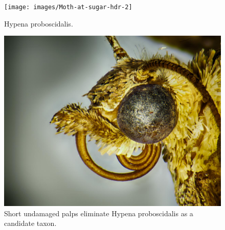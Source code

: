 \documentclass[]{article}
\begin{document}
\begin{figure}
	\centering
	\texttt{[image: images/Moth-at-sugar-hdr-2]}
	\caption{Hypena proboscidalis.}
	\label{fig:moth-at-sugar-hdr-2}
\end{figure}

\begin{figure}
	\centering
	\includegraphics[width=0.5\linewidth]{images/20201112-1}
	\caption{Short undamaged palps eliminate Hypena proboscidalis as a candidate taxon.}
	\label{fig:20201112-1}
\end{figure}
\end{document}
